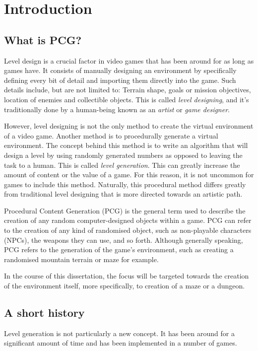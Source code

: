 \chapter{Introduction}

	\section{What is PCG?}
Level design is a crucial factor in video games that has been around for as long as games have. It consists of manually designing an environment by specifically defining every bit of detail and importing them directly into the game. Such details include, but are not limited to: Terrain shape, goals or mission objectives, location of enemies and collectible objects. This is called {\em level designing}, and it's traditionally done by a human-being known as an {\em artist} or {\em game designer}.

However, level designing is not the only method to create the virtual environment of a video game. Another method is to procedurally generate a virtual environment. The concept behind this method is to write an algorithm that will design a level by using randomly generated numbers as opposed to leaving the task to a human. This is called {\em level generation}. This can greatly increase the amount of content or the value of a game. For this reason, it is not uncommon for games to include this method. Naturally, this procedural method differs greatly from traditional level designing that is more directed towards an artistic path.

Procedural Content Generation (PCG) is the general term used to describe the creation of any random computer-designed objects within a game. PCG can refer to the creation of any kind of randomised object, such as non-playable characters (NPCs), the weapons they can use, and so forth. Although generally speaking, PCG refers to the generation of the game's environment, such as creating a randomised mountain terrain or maze for example.

In the course of this dissertation, the focus will be targeted towards the creation of the environment itself, more specifically, to creation of a maze or a dungeon.

	\section{A short history}
Level generation is not particularly a new concept. It has been around for a significant amount of time and has been implemented in a number of games.

